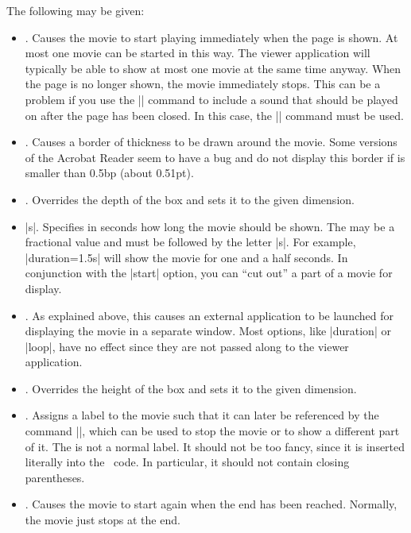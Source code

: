\begin{command}{\movie{}}
  The following  may be given:
  \begin{itemize}
  \item
    . Causes the movie to start playing immediately when the page is shown. At most one movie can be started in this way. The viewer application will typically be able to show at most one movie at the same time anyway. When the page is no longer shown, the movie immediately stops. This can be a problem if you use the |\movie| command to include a sound that should be played on after the page has been closed. In this case, the |\sound| command must be used.
  \item
    . Causes a border of thickness  to be drawn around the movie. Some versions of the Acrobat Reader seem to have a bug and do not display this border if is smaller than 0.5bp (about 0.51pt).
  \item
    . Overrides the depth of the  box and sets it to the given dimension.
  \item
    |s|. Specifies in seconds how long the movie should be shown. The  may be a fractional value and must be followed by the letter |s|. For example, |duration=1.5s| will show the movie for one and a half seconds. In conjunction with the |start| option, you can ``cut out'' a part of a movie for display.
  \item
    . As explained above, this causes an external application to be launched for displaying the movie in a separate window. Most options, like |duration| or |loop|, have no effect since they are not passed along to the viewer application.
  \item
    . Overrides the height of the  box and sets it to the given dimension.
  \item
    . Assigns a label to the movie such that it can later be referenced by the command |\hyperlinkmovie|, which can be used to stop the movie or to show a different part of it. The  is not a normal label. It should not be too fancy, since it is inserted literally into the \pdf\ code. In particular, it should not contain closing parentheses.
  \item
    . Causes the movie to start again when the end has been reached. Normally, the movie just stops at the end.

\end{itemize}
\end{command}
